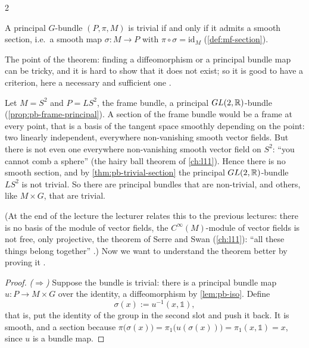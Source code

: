 \begin{paracol}{2}
\begin{theorem}\label{thm:pb-trivial-section}
A principal $G$-bundle $(P,\pi,M)$ is trivial if and only if it admits a smooth section, i.e.\ a smooth map $\sigma\colon M\to P$ with $\pi\circ\sigma=\mathrm{id}_M$ (\cref{def:mf-section}).     
\end{theorem}
The point of the theorem: finding a diffeomorphism or a principal bundle map can be tricky, and it is hard to show that it does not exist; so it is good to have a criterion, here a necessary and sufficient one  .
\begin{example}\label{ex:pb-S2}
Let $M=S^2$ and $P=LS^2$, the frame bundle, a principal $GL(2,\mathbb{R})$-bundle (\cref{prop:pb-frame-principal}). A section of the frame bundle would be a frame at every point, that is a basis of the tangent space smoothly depending on the point: two linearly independent, everywhere non-vanishing smooth vector fields. But there is not even one everywhere non-vanishing smooth vector field on $S^2$: ``you cannot comb a sphere'' (the hairy ball theorem of \cref{ch:l11}). Hence there is no smooth section, and by \cref{thm:pb-trivial-section} the principal $GL(2,\mathbb{R})$-bundle $LS^2$ is not trivial. So there are principal bundles that are non-trivial, and others, like $M\times G$, that are trivial.         
\end{example}
(At the end of the lecture the lecturer relates this to the previous lectures: there is no basis of the module of vector fields, the $C^\infty(M)$-module of vector fields is not free, only projective, the theorem of Serre and Swan (\cref{ch:l11}): ``all these things belong together''   .) Now we want to understand the theorem better by proving it  .
\begin{proof}
\emph{($\Rightarrow$)} Suppose the bundle is trivial: there is a principal bundle map $u\colon P\to M\times G$ over the identity, a diffeomorphism by \cref{lem:pb-iso}. Define
\[
  \sigma(x):=u^{-1}(x,\mathbb 1) ,
\]
that is, put the identity of the group in the second slot and push it back. It is smooth, and a section because $\pi\bigl(\sigma(x)\bigr)=\pi_1\bigl(u(\sigma(x))\bigr)=\pi_1(x,\mathbb 1)=x$, since $u$ is a bundle map.     \par

\end{proof}
\end{paracol}
